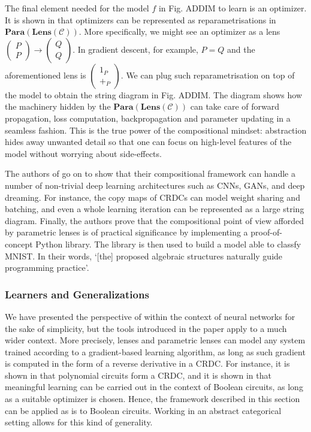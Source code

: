 \documentclass[11pt,a4paper,openright,twoside]{report}
\theoremstyle{plain}
\theoremstyle{definition}
\begin{document}
The final element needed for the model $f$ in Fig. ADDIM to learn is an optimizer. It is shown in \cite{cruttwellDeepLearningParametric} that optimizers can be represented as reparametrisations in $\mathbf{Para}(\mathbf{Lens}(\mathcal{C}))$. More specifically, we might see an optimizer as a lens $\left( \begin{smallmatrix} P \\ P \end{smallmatrix} \right) \to \left( \begin{smallmatrix} Q \\ Q \end{smallmatrix} \right)$. In gradient descent, for example, $P = Q$ and the aforementioned lens is $\left( \begin{smallmatrix} 1_P \\ +_P \end{smallmatrix} \right)$. We can plug such reparametrisation on top of the model to obtain the string diagram in Fig. ADDIM. The diagram shows how the machinery hidden by the $\mathbf{Para}(\mathbf{Lens}(\mathcal{C}))$ can take care of forward propagation, loss computation, backpropagation and parameter updating in a seamless fashion. This is the true power of the compositional mindset: abstraction hides away unwanted detail so that one can focus on high-level features of the model without worrying about side-effects.


The authors of \cite{cruttwellDeepLearningParametric} go on to show that their compositional framework can handle a number of non-trivial deep learning architectures such as CNNs, GANs, and deep dreaming. For instance, the copy maps of CRDCs can model weight sharing and batching, and even a whole learning iteration can be represented as a large string diagram. Finally, the authors prove that the compositional point of view afforded by parametric lenses is of practical significance by implementing a proof-of-concept Python library. The library is then used to build a model able to classfy MNIST. In their words, \lq[the] proposed algebraic structures naturally guide programming practice\rq.


\subsubsection{Learners and Generalizations}

We have presented the perspective of \cite{cruttwellDeepLearningParametric} within the context of neural networks for the sake of simplicity, but the tools introduced in the paper apply to a much wider context. More precisely, lenses and parametric lenses can model any system trained according to a gradient-based learning algorithm, as long as such gradient is computed in the form of a reverse derivative in a CRDC.  For instance, it is shown in \cite{wilsonCategoriesDifferentiablePolynomial2022} that polynomial circuits form a CRDC, and it is shown in \cite{wilsonReverseDerivativeAscent2021a} that meaningful learning can be carried out in the context of Boolean circuits, as long as a suitable optimizer is chosen. Hence, the framework described in this section can be applied as is to Boolean circuits. Working in an abstract categorical setting allows for this kind of generality. 
\end{document}
